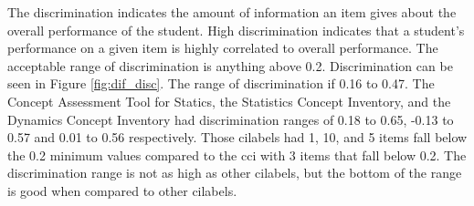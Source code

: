 The discrimination indicates the amount of information an item gives about the overall performance of the student. High discrimination indicates that a student's performance on a given item is highly correlated to overall performance. The acceptable range of discrimination is anything above 0.2. Discrimination can be seen in Figure \ref{fig:dif_disc}. The range of discrimination if 0.16 to 0.47. The Concept Assessment Tool for Statics, the Statistics Concept Inventory, and the Dynamics Concept Inventory had discrimination ranges of 0.18 to 0.65, -0.13 to 0.57 and 0.01 to 0.56 respectively. Those \glspl{cilabel} had 1, 10, and 5 items fall below the 0.2 minimum values compared to the \gls{cci} with 3 items that fall below 0.2. The discrimination range is not as high as other \glspl{cilabel}, but the bottom of the range is good when compared to other \glspl{cilabel}.

\iffalse
\iflong
The correlation coefficient can be calculated for each item to quantify how similar the item fits in with the rest of the items. The correlation for each item can be seen in Figure \ref{fig:correlation}. 


\begin{figure}[!hbp]
    \begin{center}
    \advance\leftskip-3cm
    \advance\rightskip-3cm
    \texttt{[image: images/correlation.png]}
    \caption{Correlation}
    \label{fig:correlation}
\end{center}
\end{figure}
\fi
\fi

